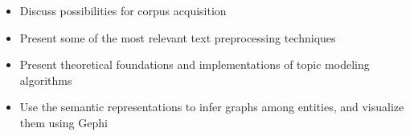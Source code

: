 \documentclass{beamer}
\begin{document}
\begin{frame}
\begin{columns}
	\begin{column}{.6\textwidth}
		\begin{itemize}
			
			\item Discuss possibilities for corpus acquisition
			\item Present some of the most relevant text preprocessing techniques
			\item Present theoretical foundations and implementations of topic modeling algorithms
			\item Use the semantic representations to infer graphs among entities, and visualize them using Gephi	
			
		\end{itemize}
	\end{column}

	\end{columns}

\end{frame}
\end{document}
